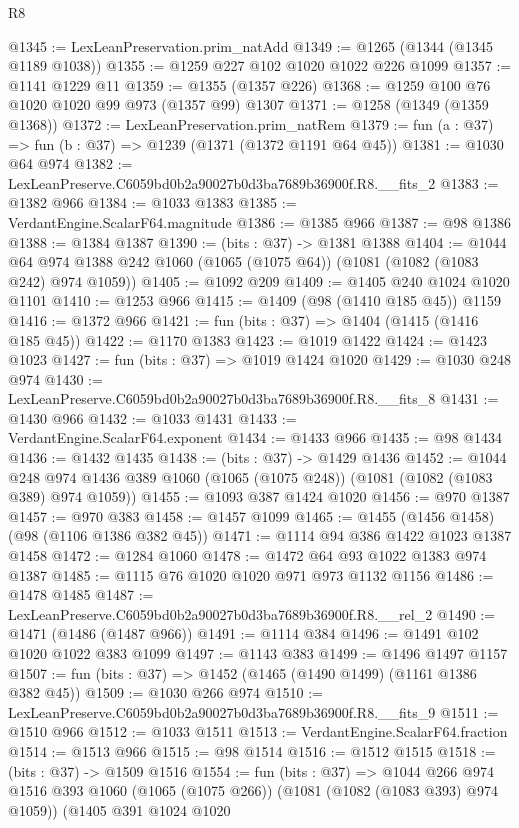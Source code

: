 \begin{lexlean}{R8}
\begin{coremodule}
@1345 := LexLeanPreservation.prim_natAdd
@1349 := @1265 (@1344 (@1345 @1189 @1038))
@1355 := @1259 @227 @102 @1020 @1022 @226 @1099
@1357 := @1141 @1229 @11
@1359 := @1355 (@1357 @226)
@1368 := @1259 @100 @76 @1020 @1020 @99 @973 (@1357 @99) @1307
@1371 := @1258 (@1349 (@1359 @1368))
@1372 := LexLeanPreservation.prim_natRem
@1379 := fun (a : @37) => fun (b : @37) => @1239 (@1371 (@1372 @1191 @64 @45))
@1381 := @1030 @64 @974
@1382 := LexLeanPreserve.C6059bd0b2a90027b0d3ba7689b36900f.R8.__fits_2
@1383 := @1382 @966
@1384 := @1033 @1383
@1385 := VerdantEngine.ScalarF64.magnitude
@1386 := @1385 @966
@1387 := @98 @1386
@1388 := @1384 @1387
@1390 := (bits : @37) -> @1381 @1388
@1404 := @1044 @64 @974 @1388 @242 @1060 (@1065 (@1075 @64)) (@1081 (@1082 (@1083 @242) @974 @1059))
@1405 := @1092 @209
@1409 := @1405 @240 @1024 @1020 @1101
@1410 := @1253 @966
@1415 := @1409 (@98 (@1410 @185 @45)) @1159
@1416 := @1372 @966
@1421 := fun (bits : @37) => @1404 (@1415 (@1416 @185 @45))
@1422 := @1170 @1383
@1423 := @1019 @1422
@1424 := @1423 @1023
@1427 := fun (bits : @37) => @1019 @1424 @1020
@1429 := @1030 @248 @974
@1430 := LexLeanPreserve.C6059bd0b2a90027b0d3ba7689b36900f.R8.__fits_8
@1431 := @1430 @966
@1432 := @1033 @1431
@1433 := VerdantEngine.ScalarF64.exponent
@1434 := @1433 @966
@1435 := @98 @1434
@1436 := @1432 @1435
@1438 := (bits : @37) -> @1429 @1436
@1452 := @1044
    @248
    @974
    @1436
    @389
    @1060
    (@1065 (@1075 @248))
    (@1081 (@1082 (@1083 @389) @974 @1059))
@1455 := @1093 @387 @1424 @1020
@1456 := @970 @1387
@1457 := @970 @383
@1458 := @1457 @1099
@1465 := @1455 (@1456 @1458) (@98 (@1106 @1386 @382 @45))
@1471 := @1114 @94 @386 @1422 @1023 @1387 @1458
@1472 := @1284 @1060
@1478 := @1472 @64 @93 @1022 @1383 @974 @1387
@1485 := @1115 @76 @1020 @1020 @971 @973 @1132 @1156
@1486 := @1478 @1485
@1487 := LexLeanPreserve.C6059bd0b2a90027b0d3ba7689b36900f.R8.__rel_2
@1490 := @1471 (@1486 (@1487 @966))
@1491 := @1114 @384
@1496 := @1491 @102 @1020 @1022 @383 @1099
@1497 := @1143 @383
@1499 := @1496 @1497 @1157
@1507 := fun (bits : @37) => @1452 (@1465 (@1490 @1499) (@1161 @1386 @382 @45))
@1509 := @1030 @266 @974
@1510 := LexLeanPreserve.C6059bd0b2a90027b0d3ba7689b36900f.R8.__fits_9
@1511 := @1510 @966
@1512 := @1033 @1511
@1513 := VerdantEngine.ScalarF64.fraction
@1514 := @1513 @966
@1515 := @98 @1514
@1516 := @1512 @1515
@1518 := (bits : @37) -> @1509 @1516
@1554 := fun (bits : @37) =>
  @1044
    @266
    @974
    @1516
    @393
    @1060
    (@1065 (@1075 @266))
    (@1081 (@1082 (@1083 @393) @974 @1059))
    (@1405
      @391
      @1024
      @1020

\end{coremodule}
\end{lexlean}
